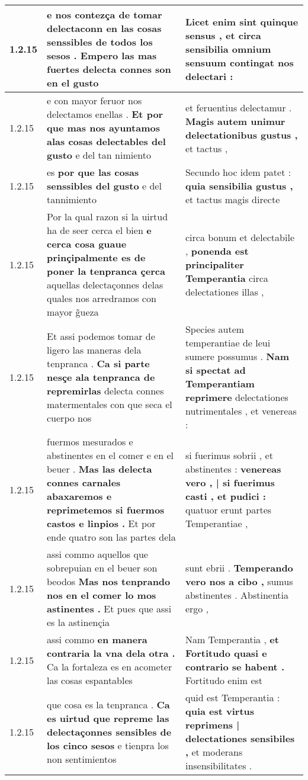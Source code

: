 \begin{tabular}{|p{1cm}|p{6.5cm}|p{6.5cm}|}
1.2.15 & e nos contezça de tomar \textbf{ delectaconn en las cosas senssibles de todos los sesos . } Empero las mas fuertes delecta connes son en el gusto & Licet enim sint quinque sensus , \textbf{ et circa sensibilia omnium sensuum } contingat nos delectari : \\\hline
1.2.15 & e con mayor feruor nos delectamos enellas . \textbf{ Et por que mas nos ayuntamos alas cosas delectables del gusto } e del tan nimiento & et feruentius delectamur . \textbf{ Magis autem unimur delectationibus gustus , } et tactus , \\\hline
1.2.15 & es \textbf{ por que las cosas senssibles del gusto } e del tannimiento & Secundo hoc idem patet : \textbf{ quia sensibilia gustus , } et tactus magis directe \\\hline
1.2.15 & Por la qual razon si la uirtud ha de seer cerca el bien \textbf{ e cerca cosa guaue prinçipalmente es de poner la tenpranca çerca } aquellas delectaçonnes delas quales nos arredramos con mayor g̃ueza & circa bonum et delectabile , \textbf{ ponenda est principaliter Temperantia } circa delectationes illas , \\\hline
1.2.15 & Et assi podemos tomar de ligero las maneras dela tenpranca . \textbf{ Ca si parte nesçe ala tenpranca de repremirlas } delecta connes matermentales con que seca el cuerpo nos & Species autem temperantiae de leui sumere possumus . \textbf{ Nam si spectat ad Temperantiam reprimere } delectationes nutrimentales , et venereas : \\\hline
1.2.15 & fuermos mesurados e abstinentes en el comer e en el beuer . \textbf{ Mas las delecta connes carnales abaxaremos e reprimetemos si fuermos castos e linpios . } Et por ende quatro son las partes dela & si fuerimus sobrii , et abstinentes : \textbf{ venereas vero , | si fuerimus casti , et pudici : } quatuor erunt partes Temperantiae , \\\hline
1.2.15 & assi commo aquellos que sobrepuian en el beuer son beodos \textbf{ Mas nos tenprando nos en el comer lo mos astinentes . } Et pues que assi es la astinençia & sunt ebrii . \textbf{ Temperando vero nos a cibo , } sumus abstinentes . Abstinentia ergo , \\\hline
1.2.15 & assi commo \textbf{ en manera contraria la vna dela otra . } Ca la fortaleza es en acometer las cosas espantables & Nam Temperantia , \textbf{ et Fortitudo quasi e contrario se habent . } Fortitudo enim est \\\hline
1.2.15 & que cosa es la tenpranca . \textbf{ Ca es uirtud que repreme las delectaçonnes sensibles de los cinco sesos } e tienpra los non sentimientos & quid est Temperantia : \textbf{ quia est virtus reprimens | delectationes sensibiles , } et moderans insensibilitates . \\\hline

\end{tabular}
